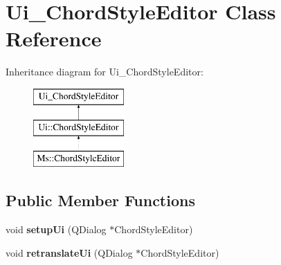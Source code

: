 \hypertarget{class_ui___chord_style_editor}{}\section{Ui\+\_\+\+Chord\+Style\+Editor Class Reference}
\label{class_ui___chord_style_editor}
Inheritance diagram for Ui\+\_\+\+Chord\+Style\+Editor\+:\begin{figure}[H]
\begin{center}
\leavevmode
\includegraphics[height=3.000000cm]{class_ui___chord_style_editor}
\end{center}
\end{figure}
\subsection*{Public Member Functions}
\begin{DoxyCompactItemize}
\item 
\mbox{\label{class_ui___chord_style_editor_a0af65bb902ff6e9d00fc933faf2b0f98}} 
void {\bfseries setup\+Ui} (Q\+Dialog $\ast$Chord\+Style\+Editor)
\item 
\mbox{\label{class_ui___chord_style_editor_adc13d1ea02253fac6a8f3d8616cc604a}} 
void {\bfseries retranslate\+Ui} (Q\+Dialog $\ast$Chord\+Style\+Editor)
\end{DoxyCompactItemize}
